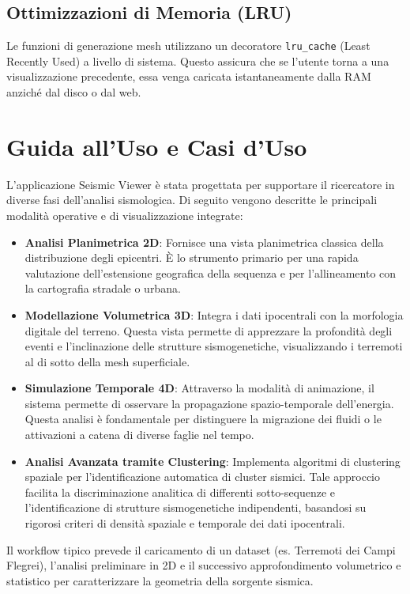 \documentclass[12pt,a4paper]{article}
\begin{document}
\subsection{Ottimizzazioni di Memoria (LRU)}
Le funzioni di generazione mesh utilizzano un decoratore \texttt{lru\_cache} (Least Recently Used) a livello di sistema. Questo assicura che se l'utente torna a una visualizzazione precedente, essa venga caricata istantaneamente dalla RAM anziché dal disco o dal web.

\section{Guida all'Uso e Casi d'Uso}
L'applicazione Seismic Viewer è stata progettata per supportare il ricercatore in diverse fasi dell'analisi sismologica. Di seguito vengono descritte le principali modalità operative e di visualizzazione integrate:

\begin{itemize}
    \item \textbf{Analisi Planimetrica 2D}: Fornisce una vista planimetrica classica della distribuzione degli epicentri. È lo strumento primario per una rapida valutazione dell'estensione geografica della sequenza e per l'allineamento con la cartografia stradale o urbana.
    \item \textbf{Modellazione Volumetrica 3D}: Integra i dati ipocentrali con la morfologia digitale del terreno. Questa vista permette di apprezzare la profondità degli eventi e l'inclinazione delle strutture sismogenetiche, visualizzando i terremoti al di sotto della mesh superficiale.
    \item \textbf{Simulazione Temporale 4D}: Attraverso la modalità di animazione, il sistema permette di osservare la propagazione spazio-temporale dell'energia. Questa analisi è fondamentale per distinguere la migrazione dei fluidi o le attivazioni a catena di diverse faglie nel tempo.
    \item \textbf{Analisi Avanzata tramite Clustering}: Implementa algoritmi di clustering spaziale per l'identificazione automatica di cluster sismici. Tale approccio facilita la discriminazione analitica di differenti sotto-sequenze e l'identificazione di strutture sismogenetiche indipendenti, basandosi su rigorosi criteri di densità spaziale e temporale dei dati ipocentrali.
\end{itemize}

Il workflow tipico prevede il caricamento di un dataset (es. Terremoti dei Campi Flegrei), l'analisi preliminare in 2D e il successivo approfondimento volumetrico e statistico per caratterizzare la geometria della sorgente sismica.
\end{document}

